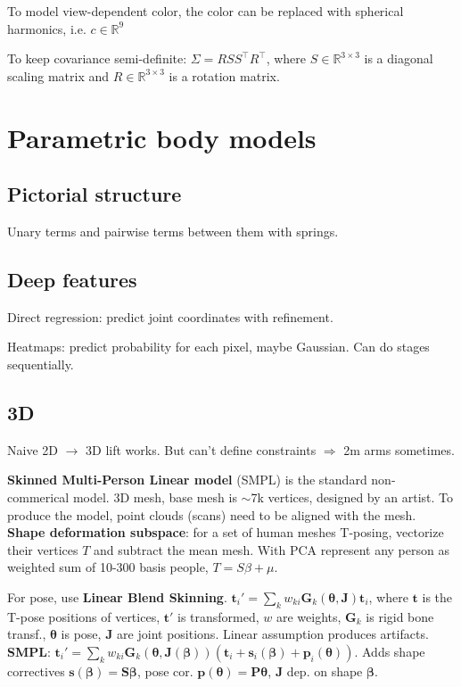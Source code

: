 \documentclass[11pt,landscape,a4paper,fleqn]{article}
\newcommand{\R}{\mathbb{R}}
\def\myvector#1{\mathbf{#1}}
\def\vp{{\myvector{p}}}
\def\vs{{\myvector{s}}}
\def\vt{{\myvector{t}}}
\def\mymatrix#1{\mathbf{#1}}
\def\mG{{\mymatrix{G}}}
\def\mJ{{\mymatrix{J}}}
\def\mP{{\mymatrix{P}}}
\def\mS{{\mymatrix{S}}}
\begin{document}
\begin{multicols*}{4}
To model view-dependent color, the color can be replaced with spherical harmonics, i.e. $c \in \R^9$

To keep covariance semi-definite: $\Sigma = RSS^\top R^\top$, where $S \in \R^{3\times 3}$ is a diagonal scaling matrix and $R \in \R^{3\times 3}$ is a rotation matrix.



\section{Parametric body models}

\subsection{Pictorial structure}

Unary terms and pairwise terms between them with springs.

\subsection{Deep features}

Direct regression: predict joint coordinates with refinement.

Heatmaps: predict probability for each pixel, maybe Gaussian.
Can do stages sequentially.

\subsection{3D}

Naive 2D $\to$ 3D lift works.
But can't define constraints $ \Rightarrow $ 2m arms sometimes.

\textbf{Skinned Multi-Person Linear model} (SMPL) is the standard non-commerical model.
3D mesh, base mesh is $\sim$7k vertices, designed by an artist.
To produce the model, point clouds (scans) need to be aligned with the mesh.
\textbf{Shape deformation subspace}: for a set of human meshes T-posing,
vectorize their vertices $T$ and subtract the mean mesh.
With PCA represent any person as weighted sum of 10-300 basis people, $T = S\beta + \mu$.

For pose, use \textbf{Linear Blend Skinning}.
$\vt_i' = \sum_k w_{ki} \mG_k(\bm\theta, \mJ)\vt_i$,
where $\vt$ is the T-pose positions of vertices,
$\vt'$ is transformed, $w$ are weights,
$\mG_k$ is rigid bone transf.,
$\bm\theta$ is pose, $\mJ$ are joint positions.
Linear assumption produces artifacts.
\textbf{SMPL}:
$\vt_i' = \sum_k w_{ki} \mG_k(\bm\theta, \mJ(\bm\beta))(\vt_i + \vs_i(\bm\beta) + \vp_i(\bm\theta))$.
Adds shape correctives $\vs(\bm\beta) = \mS\bm\beta$,
pose cor. $\vp(\bm\theta) = \mP\bm\theta$,
$\mJ$ dep. on shape $\bm\beta$.


\end{multicols*}
\end{document}

